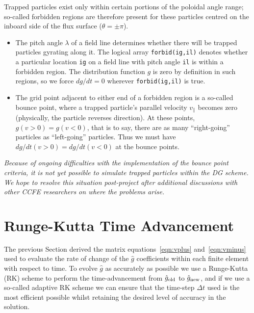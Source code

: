 \documentclass[10pt,a4paper]{article}
\begin{document}
Trapped particles exist only within certain portions of the poloidal angle
range; so-called forbidden regions are therefore present for these particles
centred on the inboard side of the flux surface ($\theta = \pm \pi$).
\begin{itemize}

\item The pitch angle $\lambda$ of a field line determines whether there will
  be trapped particles gyrating along it. The logical array
  \texttt{forbid(ig,il)} denotes whether a particular location \texttt{ig} on
  a field line with pitch angle \texttt{il} is within a forbidden region. The
  distribution function $g$ is zero by definition in such regions, so we force
  $dg/dt = 0$ wherever \texttt{forbid(ig,il)} is true.

\item The grid point adjacent to either end of a forbidden region is a
  so-called bounce point, where a trapped particle's parallel velocity
  $v_\parallel$ becomes zero (physically, the particle reverses direction). At
  these points, $g(v > 0) = g(v < 0)$, that is to say, there are as many
  ``right-going'' particles as ``left-going'' particles. Thus we must have
  $dg/dt(v > 0) = dg/dt(v < 0)$ at the bounce points.

\end{itemize}

\textit{Because of ongoing difficulties with the implementation of the bounce point
criteria, it is not yet possible to simulate trapped particles within the DG
scheme. We hope to resolve this situation post-project after additional
discussions with other CCFE researchers on where the problems arise.}

\section{Runge-Kutta Time Advancement}
\label{sec:rk}

The previous Section derived the matrix equations~\ref{eqn:vplus}
and~\ref{eqn:vminus} used to evaluate the rate of change of the $\hat{g}$
coefficients within each finite element with respect to time. To evolve
$\hat{g}$ as accurately as possible we use a Runge-Kutta (RK) scheme to
perform the time-advancement from $\hat{g}_{\mbox{\scriptsize old}}$ to
$\hat{g}_{\mbox{\scriptsize new}}$, and if we use a so-called adaptive RK
scheme we can ensure that the time-step $\Delta t$ used is the most efficient
possible whilst retaining the desired level of accuracy in the solution.
\end{document}
